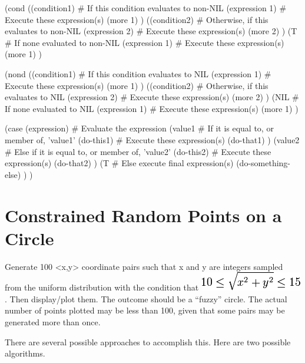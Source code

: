 \begin{wideverbatim}

(cond
   ((condition1)                 # If this condition evaluates to non-NIL
      (expression 1)             # Execute these expression(s)
      (more 1) )
   ((condition2)                 # Otherwise, if this evaluates to non-NIL
      (expression 2)             # Execute these expression(s)
      (more 2) )
   (T                            # If none evaluated to non-NIL
      (expression 1)             # Execute these expression(s)
      (more 1) )

(nond
   ((condition1)                 # If this condition evaluates to NIL
      (expression 1)             # Execute these expression(s)
      (more 1) )
   ((condition2)                 # Otherwise, if this evaluates to NIL
      (expression 2)             # Execute these expression(s)
      (more 2) )
   (NIL                          # If none evaluated to NIL
      (expression 1)             # Execute these expression(s)
      (more 1) )

(case (expression)               # Evaluate the expression
   (value1                       # If it is equal to, or member of, 'value1'
      (do-this1)                 # Execute these expression(s)
      (do-that1) )
   (value2                       # Else if it is equal to, or member of, 'value2'
      (do-this2)                 # Execute these expression(s)
      (do-that2) )
   (T                            # Else execute final expression(s)
      (do-something-else) ) )

\end{wideverbatim}

\pagebreak{}
\section*{Constrained Random Points on a Circle}


Generate 100 \textless{}x,y\textgreater{} coordinate pairs such that x
and y are integers sampled from the uniform distribution with the
condition that
\includegraphics[scale=.6]{graphics/d8c852f6bb73b0d042422df261390347.png}.
Then display/plot them. The outcome should be a ``fuzzy'' circle. The
actual number of points plotted may be less than 100, given that some
pairs may be generated more than once.

There are several possible approaches to accomplish this. Here are two
possible algorithms.


